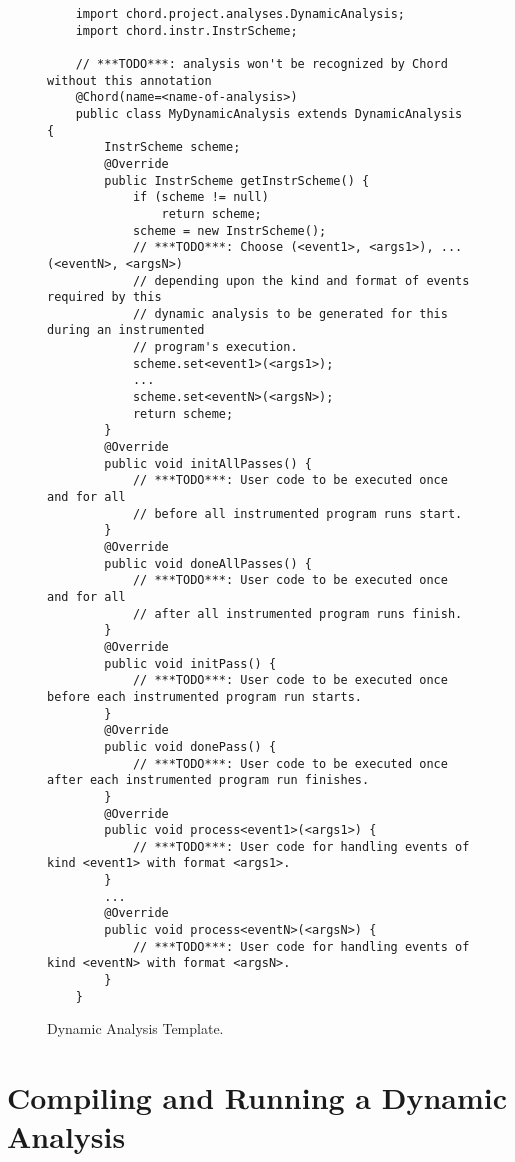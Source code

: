 \begin{figure}
{\small
\begin{verbatim}
    import chord.project.analyses.DynamicAnalysis;
    import chord.instr.InstrScheme;

    // ***TODO***: analysis won't be recognized by Chord without this annotation
    @Chord(name=<name-of-analysis>)    
    public class MyDynamicAnalysis extends DynamicAnalysis {
        InstrScheme scheme;
        @Override
        public InstrScheme getInstrScheme() {
            if (scheme != null)
                return scheme;
            scheme = new InstrScheme();
            // ***TODO***: Choose (<event1>, <args1>), ... (<eventN>, <argsN>)
            // depending upon the kind and format of events required by this
            // dynamic analysis to be generated for this during an instrumented
            // program's execution.
            scheme.set<event1>(<args1>);
            ...
            scheme.set<eventN>(<argsN>);
            return scheme;
        }
        @Override
        public void initAllPasses() {
            // ***TODO***: User code to be executed once and for all
            // before all instrumented program runs start.
        }
        @Override
        public void doneAllPasses() {
            // ***TODO***: User code to be executed once and for all
            // after all instrumented program runs finish.
        }
        @Override
        public void initPass() {
            // ***TODO***: User code to be executed once before each instrumented program run starts.
        }
        @Override
        public void donePass() {
            // ***TODO***: User code to be executed once after each instrumented program run finishes.
        }
        @Override
        public void process<event1>(<args1>) {
            // ***TODO***: User code for handling events of kind <event1> with format <args1>.
        }
        ...
        @Override
        public void process<eventN>(<argsN>) {
            // ***TODO***: User code for handling events of kind <eventN> with format <argsN>.
        }
    }
\end{verbatim}
}
\label{fig:dynamic-analysis}
\caption{Dynamic Analysis Template.}
\end{figure}

\section{Compiling and Running a Dynamic Analysis}
\label{sec:running-dynamic-analysis}

